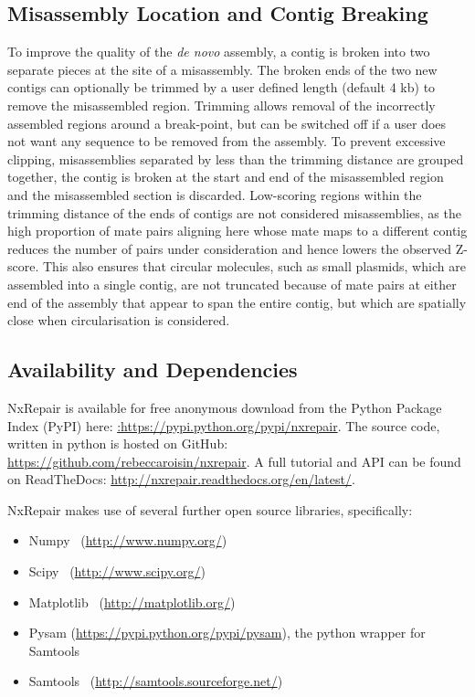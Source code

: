 \documentclass[fleqn,10pt]{wlpeerj}
\begin{document}
\subsection*{Misassembly Location and Contig Breaking}
To improve the quality of the \textit{de novo} assembly, a contig is broken into two separate pieces at the site of a misassembly. The broken ends of the two new contigs can optionally be trimmed by a user defined length (default 4 kb) to remove the misassembled region. Trimming allows removal of the incorrectly assembled regions around a break-point, but can be switched off if a user does not want any sequence to be removed from the assembly. To prevent excessive clipping, misassemblies separated by less than the trimming distance are grouped together, the contig is broken at the start and end of the misassembled region and the misassembled section is discarded. Low-scoring regions within the trimming distance of the ends of contigs are not considered misassemblies, as the high proportion of mate pairs aligning here whose mate maps to a different contig reduces the number of pairs under consideration and hence lowers the observed Z-score. This also ensures that circular molecules, such as small plasmids, which are assembled into a single contig, are not truncated because of mate pairs at either end of the assembly that appear to span the entire contig, but which are spatially close when circularisation is considered.

\subsection*{Availability and Dependencies}
NxRepair is available for free anonymous download from the Python Package Index (PyPI) here: \url{:https://pypi.python.org/pypi/nxrepair}.
The source code, written in python is hosted on GitHub: \url{https://github.com/rebeccaroisin/nxrepair}.
A full tutorial and API can be found on ReadTheDocs: \url{http://nxrepair.readthedocs.org/en/latest/}.

NxRepair makes use of several further open source libraries, specifically:

\begin{itemize}
\item[] Numpy~\citep{numpy} (\url{http://www.numpy.org/})
\item[] Scipy~\citep{scipy} (\url{http://www.scipy.org/})
\item[] Matplotlib~\citep{Hunter2007} (\url{http://matplotlib.org/})
\item[] Pysam (\url{https://pypi.python.org/pypi/pysam}), the python wrapper for Samtools
\item[] Samtools~\citep{li2009} (\url{http://samtools.sourceforge.net/})
\end{itemize}
\end{document}
